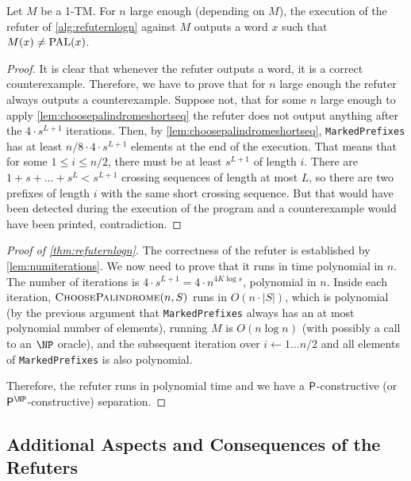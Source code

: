 \begin{lemma}
\label{lem:numiterations}
Let $M$ be a 1-TM. For $n$ large enough (depending on $M$), the execution of the refuter
of \cref{alg:refuternlogn} against $M$ outputs a word $x$ such that $M(x) \neq \mathrm{PAL}(x)$.
\end{lemma}
\begin{proof}
It is clear that whenever the refuter outputs a word, it is a correct counterexample. Therefore,
we have to prove that for $n$ large enough the refuter always outputs a counterexample. 
Suppose not, that for some $n$ large enough to apply \cref{lem:choosepalindromeshortseq}
the refuter does not output anything after the $4 \cdot s^{L+1}$ iterations.
Then, by \cref{lem:choosepalindromeshortseq}, \texttt{MarkedPrefixes} has at least $n/8 \cdot 4 \cdot s^{L+1}$
elements at the end of the execution. 
That means that for some $1 \leq i \leq n/2$, there must be at least $s^{L+1}$ of length $i$. 
There are $1 + s + \ldots + s^L < s^{L+1}$ crossing sequences of length at most $L$, so there are two 
prefixes of length $i$ with the same short crossing sequence. But that would have been detected 
during the execution of the program and a counterexample would have been printed, contradiction. 
\end{proof}

\begin{proof}[Proof of \cref{thm:refuternlogn}]
The correctness of the refuter is established by \cref{lem:numiterations}. We now need to prove that it runs in time 
polynomial in $n$.  The number of iterations is $4 \cdot s^{L+1} = 4 \cdot n^{4K \log s}$, polynomial in $n$.
Inside each iteration, $\textsc{ChoosePalindrome}(n, S)$ runs in $O(n \cdot |S|)$, which is polynomial (by the previous
argument that \texttt{MarkedPrefixes} always has an at most polynomial number of elements), 
running $M$ is $O(n \log n)$ (with possibly a call to an $\NP$ oracle),
and the subsequent iteration
over $i \gets 1 \ldots n/2$ and all elements of \texttt{MarkedPrefixes} is also polynomial.

Therefore, the refuter runs in polynomial time and we have a $\mathsf{P}$-constructive (or $\PTIME^\NP$-constructive) 
separation. 
\end{proof}

\subsection{Additional Aspects and Consequences of the Refuters}

